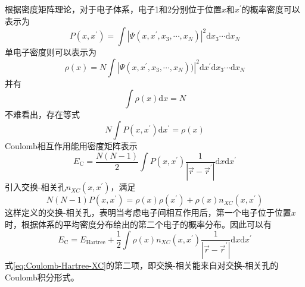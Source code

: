根据密度矩阵理论，对于电子体系，电子1和2分别位于位置$x$和$x^{\prime}$的概率密度可以表示为
\begin{equation}
	P(x,x^{\prime})=\int|\Psi(x,x^{\prime},x_3,\cdots,x_N)|^2\mathrm{d}x_3\cdots\mathrm{d}x_N
	\label{eq:density-matrix}
\end{equation}
单电子密度则可以表示为
\begin{equation}
	\rho(x)=N\int|\Psi(x,x^{\prime},x_3,\cdots,x_N))|^2\mathrm{d}x^{\prime}\mathrm{d}x_3\cdots\mathrm{d}x_N
	\label{eq:single-density}
\end{equation}
并有
\begin{equation}
	\int\rho(x)\mathrm{d}x=N
	\label{eq:N-totlal}
\end{equation}
不难看出，存在等式
\begin{equation}
	N\int P(x,x^{\prime})\mathrm{d}x^{\prime}=\rho(x)
	\label{eq:relation-matrix-N-tot}
\end{equation}
\textrm{Coulomb}相互作用能用密度矩阵表示
\begin{equation}
	E_{\mathrm{C}}=\dfrac{N(N-1)}2\int P(x,x^{\prime})\dfrac1{|\vec r-\vec r^{\prime}|}\mathrm{d}x\mathrm{d}x^{\prime}
	\label{eq:Coulomb-matrix}
\end{equation}
引入交换-相关孔$n_{XC}(x,x^{\prime})$，满足
\begin{equation}
	N(N-1)P(x,x^{\prime})=\rho(x)\rho(x^{\prime})+\rho(x)n_{XC}(x,x^{\prime})
	\label{eq:ex-ch-hole}
\end{equation}
这样定义的交换-相关孔，表明当考虑电子间相互作用后，第一个电子位于位置$x$时，根据体系的平均密度分布给出的第二个电子的概率分布。因此可以有
\begin{equation}
	E_{\mathrm{C}}=E_{\mathrm{Hartree}}+\dfrac12\int \rho(x)n_{XC}(x,x^{\prime})\dfrac1{|\vec r-\vec r^{\prime}|}\mathrm{d}x\mathrm{d}x^{\prime}
	\label{eq:Coulomb-Hartree-XC}
\end{equation}
式\eqref{eq:Coulomb-Hartree-XC}的第二项，即交换-相关能来自对交换-相关孔的\textrm{Coulomb}积分形式。


